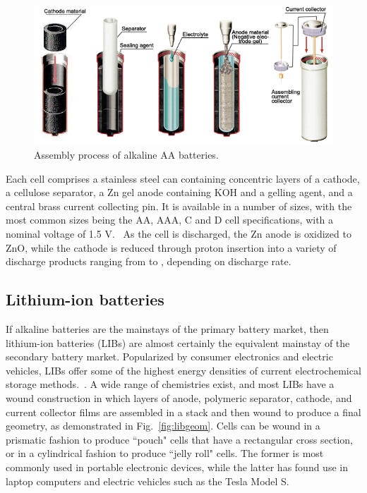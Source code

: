 \begin{figure}[htb]
  \centering
    \includegraphics[width=\textwidth]{ch2-pastwork/images/cellassembly.png}
    \caption[Assembly process of alkaline AA batteries.]{Assembly process of alkaline AA batteries.}
    \label{fig:cellassembly}
\end{figure}

Each cell comprises a stainless steel can containing concentric layers of a  cathode, a cellulose separator, a Zn gel anode containing KOH and a gelling agent, and a central brass current collecting pin. It is available in a number of sizes, with the most common sizes being the AA, AAA, C and D cell specifications, with a nominal voltage of 1.5 V.~\cite{linden} As the cell is discharged, the Zn anode is oxidized to ZnO, while the  cathode is reduced through proton insertion into a variety of discharge products ranging from  to , depending on discharge rate.~\cite{Gallaway2015-xy}


\subsection{Lithium-ion batteries}

If alkaline batteries are the mainstays of the primary battery market, then lithium-ion batteries (LIBs) are almost certainly the equivalent mainstay of the secondary battery market. Popularized by consumer electronics and electric vehicles, LIBs offer some of the highest energy densities of current electrochemical storage methods.~\cite{linden}. A wide range of chemistries exist, and most LIBs have a wound construction in which layers of anode, polymeric separator, cathode, and current collector films are assembled in a stack and then wound to produce a final geometry, as demonstrated in Fig.~\ref{fig:libgeom}. Cells can be wound in a prismatic fashion to produce ``pouch" cells that have a rectangular cross section, or in a cylindrical fashion to produce ``jelly roll" cells. The former is most commonly used in portable electronic devices, while the latter has found use in laptop computers and electric vehicles such as the Tesla Model S.

